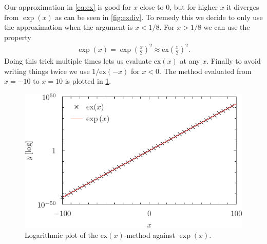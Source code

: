 \documentclass[UKenglish,a4paper, 11pt]{article}
\newcommand{\ex}{\mathrm{ex}}
\begin{document}
Our approximation in \cref{eq:ex} is good for $x$ close to 0, but for higher $x$ it diverges from $\exp (x)$ as can be seen in \cref{fig:exdiv}.	To remedy this we decide to only use the approximation when the argument is $x<1/8$. For $x>1/8$ we can use the property
\begin{align}
	\exp( x) = \exp\left(\frac{x}{2}\right)^2 \approx \ex \left(\frac{x}{2}\right)^2.
\end{align}
Doing this trick multiple times lets us evaluate $\ex (x)$ at any $x$. Finally to avoid writing things twice we use $1/\ex(-x)$ for $x<0$. The method evaluated from $x=-10$ to $x=10$ is plotted in \cref{fig:testplot}.
\begin{figure}[h]
	\centering
	\includegraphics{testplot.pdf}
	\caption{Logarithmic plot of the $\ex (x)$-method against $\exp(x)$.}\label{fig:testplot}
\end{figure}
\end{document}
